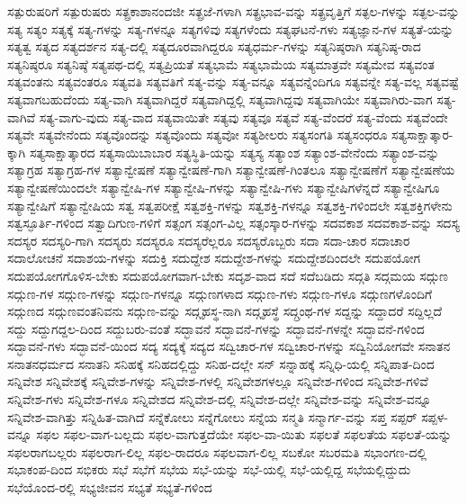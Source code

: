 {ಸತ್ಪುರುಷರಿಗೆ
ಸತ್ಪುರುಷರು
ಸತ್ಪ್ರಕಾಶಾನಂದಜೀ
ಸತ್ಪ್ರಜೆ-ಗಳಾಗಿ
ಸತ್ಪ್ರಭಾವ-ವನ್ನು
ಸತ್ಪ್ರವೃತ್ತಿಗೆ
ಸತ್ಫಲ-ಗಳನ್ನು
ಸತ್ಫಲ-ವನ್ನು
ಸತ್ಯ
ಸತ್ಯಂ
ಸತ್ಯಕ್ಕೆ
ಸತ್ಯ-ಗಳನ್ನು
ಸತ್ಯ-ಗಳನ್ನೂ
ಸತ್ಯಗಳಿವು
ಸತ್ಯಗಳೆಂದು
ಸತ್ಯಘಟನೆ-ಗಳು
ಸತ್ಯಜ್ಞಾನ-ಗಳ
ಸತ್ಯತೆ-ಯನ್ನು
ಸತ್ಯತ್ವ
ಸತ್ಯದ
ಸತ್ಯದರ್ಶನ
ಸತ್ಯ-ದಲ್ಲಿ
ಸತ್ಯದೂರವಾಗಿದ್ದರೂ
ಸತ್ಯಧರ್ಮ-ಗಳನ್ನು
ಸತ್ಯನಿಷ್ಠರಾಗಿ
ಸತ್ಯನಿಷ್ಠ-ರಾದ
ಸತ್ಯನಿಷ್ಠರೂ
ಸತ್ಯನಿಷ್ಠೆ
ಸತ್ಯಪಥ-ದಲ್ಲಿ
ಸತ್ಯಪ್ರಿಯತೆ
ಸತ್ಯಭಾಮೆ
ಸತ್ಯಭಾಮೆಯ
ಸತ್ಯಮಾತ್ರವೇ
ಸತ್ಯಮೇವ
ಸತ್ಯವಂತ
ಸತ್ಯವಂತನು
ಸತ್ಯವಂತರೂ
ಸತ್ಯವತಿ
ಸತ್ಯವತಿಗೆ
ಸತ್ಯ-ವನ್ನು
ಸತ್ಯ-ವನ್ನೂ
ಸತ್ಯವನ್ನೆಂದಿಗೂ
ಸತ್ಯವನ್ನೇ
ಸತ್ಯ-ವಲ್ಲ
ಸತ್ಯವಷ್ಟೆ
ಸತ್ಯವಾಗಬಹುದೆಂದು
ಸತ್ಯ-ವಾಗಿ
ಸತ್ಯವಾಗಿದ್ದರೆ
ಸತ್ಯವಾಗಿದ್ದಲ್ಲಿ
ಸತ್ಯವಾಗಿದ್ದವು
ಸತ್ಯವಾಗಿಯೇ
ಸತ್ಯವಾಗಿರು-ವಾಗ
ಸತ್ಯ-ವಾಗಿವೆ
ಸತ್ಯ-ವಾಗು-ವುದು
ಸತ್ಯ-ವಾದ
ಸತ್ಯವಾಯಿತೇ
ಸತ್ಯವು
ಸತ್ಯವೂ
ಸತ್ಯವೆ
ಸತ್ಯ-ವೆಂದರೆ
ಸತ್ಯ-ವೆಂದು
ಸತ್ಯವೆಂದೇ
ಸತ್ಯವೇ
ಸತ್ಯವೇನೆಂದು
ಸತ್ಯವೊಂದನ್ನು
ಸತ್ಯವೊಂದು
ಸತ್ಯವೋ
ಸತ್ಯಶೀಲರು
ಸತ್ಯಸಂಗತಿ
ಸತ್ಯಸಂಧರೂ
ಸತ್ಯಸಾಕ್ಷಾತ್ಕಾರ-ಕ್ಕಾಗಿ
ಸತ್ಯಸಾಕ್ಷಾತ್ಕಾರದ
ಸತ್ಯಸಾಯಿಬಾಬಾರ
ಸತ್ಯಸ್ಥಿತಿ-ಯನ್ನು
ಸತ್ಯಸ್ಯ
ಸತ್ಯಾಂಶ
ಸತ್ಯಾಂಶ-ವೇನೆಂದು
ಸತ್ಯಾಂಶ-ವನ್ನು
ಸತ್ಯಾಗ್ರಹ
ಸತ್ಯಾಗ್ರಹ-ಗಳ
ಸತ್ಯಾನ್ವೇಷಣೆ
ಸತ್ಯಾನ್ವೇಷಣೆ-ಗಾಗಿ
ಸತ್ಯಾನ್ವೇಷಣೆ-ಗಿಂತಲೂ
ಸತ್ಯಾನ್ವೇಷಣೆಗೆ
ಸತ್ಯಾನ್ವೇಷಣೆಯ
ಸತ್ಯಾನ್ವೇಷಣೆಯಿಂದಲೇ
ಸತ್ಯಾನ್ವೇಷಿ-ಗಳ
ಸತ್ಯಾನ್ವೇಷಿ-ಗಳನ್ನು
ಸತ್ಯಾನ್ವೇಷಿ-ಗಳು
ಸತ್ಯಾನ್ವೇಷಿಗಳೆನ್ನದೆ
ಸತ್ಯಾನ್ವೇಷಿಗೂ
ಸತ್ಯಾನ್ವೇಷಿಗೆ
ಸತ್ಯಾನ್ವೇಷಿಯ
ಸತ್ವ
ಸತ್ವಪರೀಕ್ಷೆ
ಸತ್ವಶಕ್ತಿ-ಗಳನ್ನು
ಸತ್ವಶಕ್ತಿ-ಗಳನ್ನೂ
ಸತ್ವಶಕ್ತಿ-ಗಳಿಂದಲೇ
ಸತ್ವಶಕ್ತಿಗಳೇನು
ಸತ್ವಸ್ಫೂರ್ತಿ-ಗಳಿಂದ
ಸತ್ವಾದಿಗುಣ-ಗಳಿಗೆ
ಸತ್ಸಂಗ
ಸತ್ಸಂಗ-ವಿಲ್ಲ
ಸತ್ಸಂಸ್ಕಾರ-ಗಳನ್ನು
ಸದವಕಾಶ
ಸದವಕಾಶ-ವನ್ನು
ಸದಸ್ಯ
ಸದಸ್ಯರ
ಸದಸ್ಯರಿ-ಗಾಗಿ
ಸದಸ್ಯರು
ಸದಸ್ಯರೂ
ಸದಸ್ಯರೆಲ್ಲರೂ
ಸದಸ್ಯರೊಬ್ಬರು
ಸದಾ
ಸದಾ-ಚಾರ
ಸದಾಚಾರ
ಸದಾಲೋಚನೆ
ಸದಾಶಯ-ಗಳನ್ನು
ಸದುಕ್ತಿ
ಸದುದ್ದೇಶ
ಸದುದ್ದೇಶ-ಗಳನ್ನು
ಸದುದ್ದೇಶದಿಂದಲೇ
ಸದುಪಯೋಗ
ಸದುಪಯೋಗಗೊಳಿಸ-ಬೇಕು
ಸದುಪಯೋಗವಾಗ-ಬೇಕು
ಸದೃಶ-ವಾದ
ಸದೆ
ಸದೆಬಡಿದು
ಸದ್ಗತಿ
ಸದ್ಗಮಯ
ಸದ್ಗುಣ
ಸದ್ಗುಣ-ಗಳ
ಸದ್ಗುಣ-ಗಳನ್ನು
ಸದ್ಗುಣ-ಗಳನ್ನೂ
ಸದ್ಗುಣಗಳಾದ
ಸದ್ಗುಣ-ಗಳು
ಸದ್ಗುಣ-ಗಳೂ
ಸದ್ಗುಣಗಳೊಂದಿಗೆ
ಸದ್ಗುಣದ
ಸದ್ಗುಣವಂತನಿವನು
ಸದ್ಗುಣ-ವನ್ನು
ಸದ್ಗೃಹಸ್ಥ-ನಾಗಿ
ಸದ್ಗೃಹಸ್ಥೆ
ಸದ್ಗ್ರಂಥ-ಗಳ
ಸದ್ದನ್ನು
ಸದ್ದಾದರೆ
ಸದ್ದಿಲ್ಲದೆ
ಸದ್ದು
ಸದ್ದುಗದ್ದಲ-ದಿಂದ
ಸದ್ದುಬರು-ವಂತೆ
ಸದ್ಭಾವನೆ
ಸದ್ಭಾವನೆ-ಗಳನ್ನು
ಸದ್ಭಾವನೆ-ಗಳನ್ನೇ
ಸದ್ಭಾವನೆ-ಗಳಿಂದ
ಸದ್ಭಾವನೆ-ಗಳು
ಸದ್ಭಾವನೆ-ಯಿಂದ
ಸದ್ಯ
ಸದ್ಯಕ್ಕೆ
ಸದ್ಯದ
ಸದ್ವಿಚಾರ-ಗಳ
ಸದ್ವಿಚಾರ-ಗಳನ್ನು
ಸದ್ವಿನಿಯೋಗವೇ
ಸನಾತನ
ಸನಾತನಧರ್ಮದ
ಸನಾತನಿ
ಸನಿಹಕ್ಕೆ
ಸನಿಹದಲ್ಲಿದ್ದು
ಸನಿಹ-ದಲ್ಲೇ
ಸನ್
ಸನ್ನಾಹಕ್ಕೆ
ಸನ್ನಿಧಿ-ಯಲ್ಲಿ
ಸನ್ನಿಪಾತ-ದಿಂದ
ಸನ್ನಿವೇಶ
ಸನ್ನಿವೇಶಕ್ಕೆ
ಸನ್ನಿವೇಶ-ಗಳನ್ನು
ಸನ್ನಿವೇಶ-ಗಳಲ್ಲಿ
ಸನ್ನಿವೇಶಗಳಲ್ಲೂ
ಸನ್ನಿವೇಶ-ಗಳಿಂದ
ಸನ್ನಿವೇಶ-ಗಳಿವೆ
ಸನ್ನಿವೇಶ-ಗಳು
ಸನ್ನಿವೇಶ-ಗಳೂ
ಸನ್ನಿವೇಶದ
ಸನ್ನಿವೇಶ-ದಲ್ಲಿ
ಸನ್ನಿವೇಶ-ದಲ್ಲೇ
ಸನ್ನಿವೇಶ-ವನ್ನು
ಸನ್ನಿವೇಶ-ವನ್ನೂ
ಸನ್ನಿವೇಶ-ವಾಗಿತ್ತು
ಸನ್ನಿಹಿತ-ವಾಗಿದೆ
ಸನ್ನೆಕೋಲು
ಸನ್ನೆಗೋಲು
ಸನ್ನೆಯ
ಸನ್ಮತಿ
ಸನ್ಮಾರ್ಗ-ವನ್ನು
ಸಪ್ತ
ಸಪ್ಪರ್
ಸಪ್ಪಳ-ವನ್ನೂ
ಸಫಲ
ಸಫಲ-ವಾಗ-ಬಲ್ಲದು
ಸಫಲ-ವಾಗುತ್ತದೆಯೇ
ಸಫಲ-ವಾ-ಯಿತು
ಸಫಲತೆ
ಸಫಲತೆಯ
ಸಫಲತೆ-ಯನ್ನು
ಸಫಲರಾಗಬಲ್ಲರು
ಸಫಲರಾಗ-ಲಿಲ್ಲ
ಸಫಲ-ರಾದರೂ
ಸಫಲವಾಗ-ಲಿಲ್ಲ
ಸಬಕೋ
ಸಬರಮತಿ
ಸಭಾಂಗಣ-ದಲ್ಲಿ
ಸಭಾಕಂಪ-ದಿಂದ
ಸಭಿಕರು
ಸಭೆ
ಸಭೆಗೆ
ಸಭೆಯ
ಸಭೆ-ಯನ್ನು
ಸಭೆ-ಯಲ್ಲಿ
ಸಭೆ-ಯಲ್ಲಿದ್ದ
ಸಭೆಯಲ್ಲಿದ್ದುದು
ಸಭೆಯೊಂದ-ರಲ್ಲಿ
ಸಭ್ಯಜೀವನ
ಸಭ್ಯತೆ
ಸಭ್ಯತೆ-ಗಳಿಂದ
}
